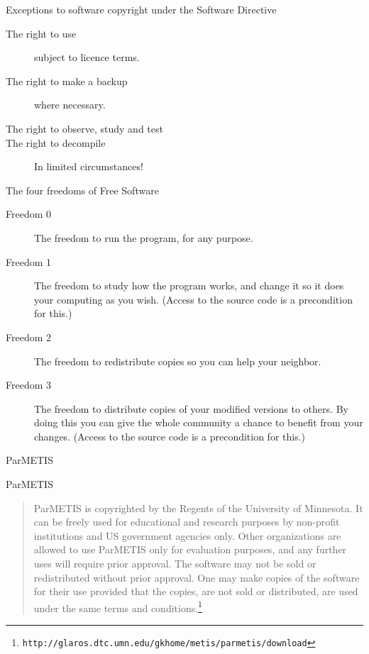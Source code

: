 \documentclass[t]{beamer}
\def\url#1{\texttt{#1}}\fi
\begin{document}
\begin{frame}{Exceptions to software copyright under the Software Directive}

\begin{description}
  \item[The right to use] subject to licence terms.
  \item[The right to make a backup] where necessary.
  \item[The right to observe, study and test] 
  \item [The right to decompile] In limited circumstances!
\end{description}
\end{frame}

\begin{frame}{The four freedoms of Free Software}
\begin{description}
  \item[Freedom 0] The freedom to run the program, for any purpose.
  \item[Freedom 1] The freedom to study how the program works, and change it so it does your computing as you wish. (Access to the source code is a precondition for this.)
  \item[Freedom 2] The freedom to redistribute copies so you can help your neighbor.
  \item[Freedom 3] The freedom to distribute copies of your modified
    versions to others. By doing this you can give the whole community a
    chance to benefit from your changes. (Access to the source code is a
    precondition for this.)
\end{description}
\end{frame}

\begin{frame}{ParMETIS}
  
\end{frame}

\begin{frame}{ParMETIS}
  \begin{quotation}
  ParMETIS is copyrighted by the Regents of the University of Minnesota. It
  can be freely used for educational and research purposes by non-profit
  institutions and US government agencies only. Other organizations are
  allowed to use ParMETIS only for evaluation purposes, and any further uses
  will require prior approval. The software may not be sold or redistributed
  without prior approval. One may make copies of the software for their use
  provided that the copies, are not sold or distributed, are used under the
  same terms and conditions.\footnote{\url{http://glaros.dtc.umn.edu/gkhome/metis/parmetis/download}}
\end{quotation}

\end{frame}
\end{document}
